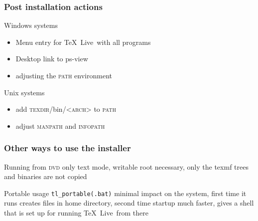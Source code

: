 \documentclass{beamer}
\newcommand{\tl}{\TeX~Live}
\newcommand{\acro}[1]{\textsc{\MakeLowercase{#1}}}
\def\medit{\\[\medskipamount]}
\begin{document}
\begin{frame}
  \frametitle{Post installation actions}
  \begin{block}{Windows systems}
    \vspace{-\baselineskip}
    \begin{itemize}
    \item Menu entry for \tl\ with all programs\medit
    \item Desktop link to ps-view\medit
    \item adjusting the \acro{PATH} environment\medit
    \end{itemize}\pause
  \end{block}
  \begin{block}{Unix systems}
    \vspace{-\baselineskip}
    \begin{itemize}
    \item add \acro{TEXDIR}/bin/<\acro{ARCH}> to \acro{PATH}\medit
    \item adjust \acro{MANPATH} and \acro{INFOPATH}
    \end{itemize}
  \end{block}
\end{frame}

\begin{frame}
  \frametitle{Other ways to use the installer}
  \begin{block}{Running from \acro{DVD}}
    only text mode, writable root necessary, only the texmf trees and
    binaries are not copied
  \end{block}
  \pause
  \begin{block}{Portable usage \texttt{tl\_portable(.bat)}}
    minimal impact on the system, first time it runs creates files in
    home directory, second time startup much faster, gives a shell
    that is set up for running \tl\ from there
  \end{block}
\end{frame}
\end{document}
